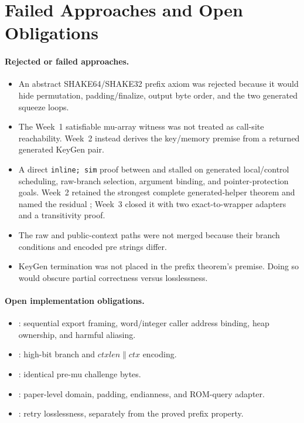 \section{Failed Approaches and Open Obligations}

\paragraph{Rejected or failed approaches.}
\begin{itemize}
  \item An abstract SHAKE64/SHAKE32 prefix axiom was rejected because it would
  hide permutation, padding/finalize, output byte order, and the two generated
  squeeze loops.
  \item The Week~1 satisfiable mu-array witness was not treated as call-site
  reachability. Week~2 instead derives the key/memory premise from a returned
  generated KeyGen pair.
  \item A direct \texttt{inline; sim} proof between
   and
   stalled on generated local/control
  scheduling, raw-branch selection, argument binding, and pointer-protection
  goals. Week~2 retained the strongest complete generated-helper theorem and
  named the residual ; Week~3 closed it with
  two exact-to-wrapper adapters and a transitivity proof.
  \item The raw and public-context paths were not merged because their branch
  conditions and encoded pre strings differ.
  \item KeyGen termination was not placed in the prefix theorem's premise.
  Doing so would obscure partial correctness versus losslessness.
\end{itemize}

\paragraph{Open implementation obligations.}
\begin{itemize}
  \item {}: sequential export framing,
  word/integer caller address binding, heap ownership, and harmful aliasing.
  \item {}: high-bit branch and
  \(ctxlen\mathbin{\|}ctx\) encoding.
  \item {}: identical pre-mu challenge bytes.
  \item {}: paper-level domain, padding,
  endianness, and ROM-query adapter.
  \item {}: retry losslessness, separately from the
  proved prefix property.
\end{itemize}

